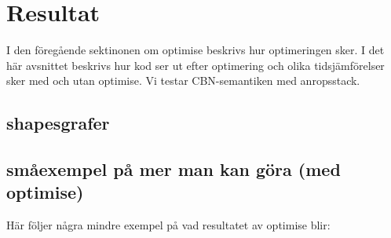 \documentclass[Rapport]{subfiles}
\begin{document}
\section{Resultat}
\label{sec:Resultat}

I den föregående sektinonen om optimise beskrivs hur optimeringen sker.
I det här avsnittet beskrivs hur kod ser ut efter optimering och 
olika tidsjämförelser sker med och utan optimise. 
Vi testar CBN-semantiken med anropsstack.

\subsection{shapesgrafer}


\subsection{småexempel på mer man kan göra (med optimise)} 

Här följer några mindre exempel på vad resultatet av optimise blir:
\end{document}
